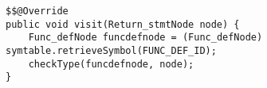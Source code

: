 \begin{lstlisting}[caption={Visit return statement node in the return statement type check visitor}, label={code:RSTC:return}]
$$@Override
public void visit(Return_stmtNode node) {
    Func_defNode funcdefnode = (Func_defNode) symtable.retrieveSymbol(FUNC_DEF_ID);
    checkType(funcdefnode, node);
}
\end{lstlisting}